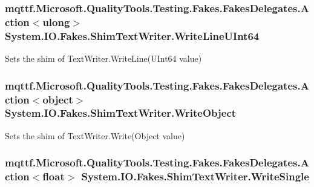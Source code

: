 \hypertarget{class_system_1_1_i_o_1_1_fakes_1_1_shim_text_writer_a57ae6aa734ee4a3b42e89c366adb8fda}{
\subsubsection[{Write\-Line\-U\-Int64}]{\setlength{\rightskip}{0pt plus 5cm}mqttf.\-Microsoft.\-Quality\-Tools.\-Testing.\-Fakes.\-Fakes\-Delegates.\-Action$<$ulong$>$ System.\-I\-O.\-Fakes.\-Shim\-Text\-Writer.\-Write\-Line\-U\-Int64\hspace{0.3cm}{\ttfamily [set]}}}\label{class_system_1_1_i_o_1_1_fakes_1_1_shim_text_writer_a57ae6aa734ee4a3b42e89c366adb8fda}


Sets the shim of Text\-Writer.\-Write\-Line(\-U\-Int64 value)

\hypertarget{class_system_1_1_i_o_1_1_fakes_1_1_shim_text_writer_ae757c9edec3e6f8933f64eef78bbfecb}{
\subsubsection[{Write\-Object}]{\setlength{\rightskip}{0pt plus 5cm}mqttf.\-Microsoft.\-Quality\-Tools.\-Testing.\-Fakes.\-Fakes\-Delegates.\-Action$<$object$>$ System.\-I\-O.\-Fakes.\-Shim\-Text\-Writer.\-Write\-Object\hspace{0.3cm}{\ttfamily [set]}}}\label{class_system_1_1_i_o_1_1_fakes_1_1_shim_text_writer_ae757c9edec3e6f8933f64eef78bbfecb}


Sets the shim of Text\-Writer.\-Write(\-Object value)

\hypertarget{class_system_1_1_i_o_1_1_fakes_1_1_shim_text_writer_a5447da9d571f02ac71a121d7b970feed}{
\subsubsection[{Write\-Single}]{\setlength{\rightskip}{0pt plus 5cm}mqttf.\-Microsoft.\-Quality\-Tools.\-Testing.\-Fakes.\-Fakes\-Delegates.\-Action$<$float$>$ System.\-I\-O.\-Fakes.\-Shim\-Text\-Writer.\-Write\-Single\hspace{0.3cm}{\ttfamily [set]}}}\label{class_system_1_1_i_o_1_1_fakes_1_1_shim_text_writer_a5447da9d571f02ac71a121d7b970feed}


